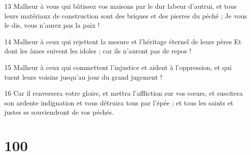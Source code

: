 \par 13 Malheur à vous qui bâtissez vos maisons par le dur labeur d'autrui, et tous leurs matériaux de construction sont des briques et des pierres du péché ; Je vous le dis, vous n'aurez pas la paix !
\par 14 Malheur à ceux qui rejettent la mesure et l'héritage éternel de leurs pères Et dont les âmes suivent les idoles ; car ils n'auront pas de repos !
\par 15 Malheur à ceux qui commettent l'injustice et aident à l'oppression, et qui tuent leurs voisins jusqu'au jour du grand jugement !
\par 16 Car il renversera votre gloire, et mettra l'affliction sur vos cœurs, et suscitera son ardente indignation et vous détruira tous par l'épée ; et tous les saints et justes se souviendront de vos péchés.

\chapter{100}

